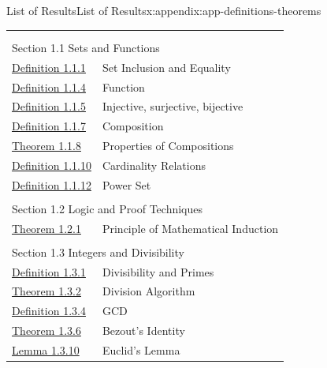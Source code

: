 \documentclass[oneside,10pt,]{book}
\numberwithin{equation}{section}
\begin{document}
%
%
\typeout{************************************************}
\typeout{************************************************}
%
\begin{appendixptx}{List of Results}{}{List of Results}{}{}{x:appendix:app-definitions-theorems}
\noindent
\begin{longtable}[l]{ll}
\addtocounter{table}{-1}
\endfirsthead
\endhead
\multicolumn{2}{r}{(Continued on next page)}\\
\endfoot
\endlastfoot
\multicolumn{2}{l}{\null}\\[1.5ex] \multicolumn{2}{l}{\large Section 1.1 Sets and Functions}\\[0.5ex]
\hyperref[x:definition:def-set-inclusion-equality]{Definition 1.1.1}& Set Inclusion and Equality\\
\hyperref[x:definition:def-function]{Definition 1.1.4}& Function\\
\hyperref[x:definition:def-injective]{Definition 1.1.5}& Injective, surjective, bijective\\
\hyperref[x:definition:def-composition]{Definition 1.1.7}& Composition\\
\hyperref[x:theorem:thm-composition-of-bijections]{Theorem 1.1.8}& Properties of Compositions\\
\hyperref[x:definition:def-cardinality]{Definition 1.1.10}& Cardinality Relations\\
\hyperref[x:definition:def-power-set]{Definition 1.1.12}& Power Set\\
\multicolumn{2}{l}{\null}\\[1.5ex] \multicolumn{2}{l}{\large Section 1.2 Logic and Proof Techniques}\\[0.5ex]
\hyperref[x:theorem:thm-induction]{Theorem 1.2.1}& Principle of Mathematical Induction\\
\multicolumn{2}{l}{\null}\\[1.5ex] \multicolumn{2}{l}{\large Section 1.3 Integers and Divisibility}\\[0.5ex]
\hyperref[x:definition:def-divisibility]{Definition 1.3.1}& Divisibility and Primes\\
\hyperref[x:theorem:thm-division-algorithm]{Theorem 1.3.2}& Division Algorithm\\
\hyperref[x:definition:def-gcd]{Definition 1.3.4}& GCD\\
\hyperref[x:theorem:thm-bezout]{Theorem 1.3.6}& Bezout's Identity\\
\hyperref[x:lemma:lem-euclid]{Lemma 1.3.10}& Euclid's Lemma\\

\end{longtable}
\end{appendixptx}
\end{document}
